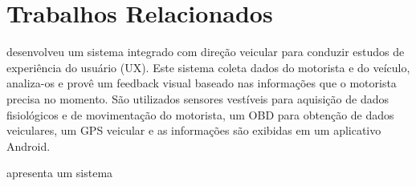 \section{Trabalhos Relacionados}
\label{trabalhos-relacionados}

\cite{park2016integrated} desenvolveu um sistema integrado com direção veicular para conduzir estudos de experiência
do usuário (UX). Este sistema coleta dados do motorista e do veículo, analiza-os e provê um feedback visual baseado
nas informações que o motorista precisa no momento. São utilizados sensores vestíveis para aquisição de dados
fisiológicos e de movimentação do motorista, um OBD para obtenção de dados veiculares, um GPS veicular e as informações
são exibidas em um aplicativo Android.

\cite{eren2012estimating} apresenta um sistema
